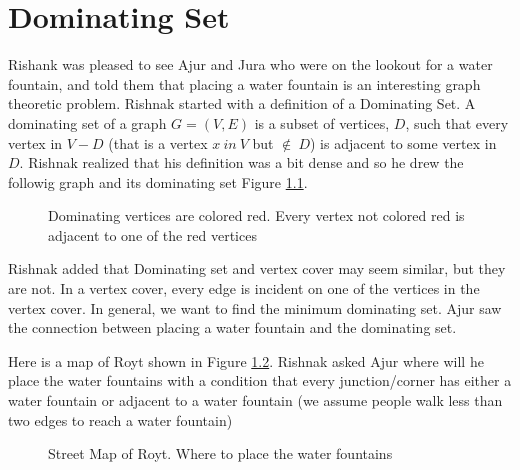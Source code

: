 \chapter{Dominating Set}

Rishank was pleased to see Ajur and Jura who were on the lookout for a water fountain, and told them that placing a water fountain is an interesting graph theoretic problem. Rishnak started with a definition of a Dominating Set. A dominating set of a graph $G=(V,E)$ is a subset of vertices, $D$, such that every vertex in $V-D$ (that is a vertex $x~in ~V $ but $\notin~ D$) is adjacent to some vertex in $D$. Rishnak realized that his definition was a bit dense and so he drew the followig graph and its dominating set Figure \ref{18g1}.
\begin{figure}
\begin{center}
\caption{ Dominating vertices are colored red. Every vertex not colored red is adjacent to one of the red vertices}\label{18g1}
\end{center}
\end{figure}

Rishnak added that Dominating set and vertex cover may seem similar, but they are not. In a vertex cover, every edge is incident on one of the vertices in the vertex cover. In general, we want to find the minimum dominating set. Ajur saw the connection between placing a water fountain and the dominating set.

Here is a map of Royt shown in Figure \ref{18g2}. Rishnak asked Ajur where will he place the water fountains with a condition that every junction/corner has either a water fountain or adjacent to a water fountain (we assume people walk less than two edges to reach a water fountain)
\begin{figure}
\begin{center}

\caption{Street Map of Royt. Where to place the water fountains}\label{18g2}
\end{center}
\end{figure}

